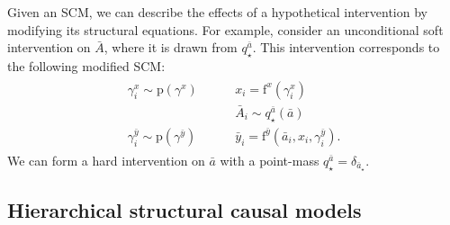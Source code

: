 \documentclass[12pt]{article}
\newcommand{\pr}{\mathrm{p}}
\newcommand{\f}{\mathrm{f}}
\begin{document}
Given an SCM, we can describe the effects of a hypothetical intervention by modifying its structural equations.  For example, consider an unconditional soft intervention on $\bar{A}$, where it is drawn from $q^{\bar{a}}_\star$. This intervention corresponds to the following modified SCM:
\begin{align}
  \label{eqn:ex-scm-intervene}
  \begin{split}
    \gamma_i^{x} \sim \pr(\gamma^{x}) \,\,\,\,\,\,
    &\,\,\,\,\,\,\, x_i = \f^x(\gamma^{x}_i)\\
    &\,\,\,\,\,\,\,\bar{A}_i \sim q_\star^{\bar{a}}(\bar{a})\\
    \gamma_i^{\bar{y}} \sim \pr(\gamma^{\bar{y}}) \,\,\,\,\,\,
    &\,\,\,\,\,\,\, \bar{y}_i = \f^{\bar{y}}(\bar{a}_i, x_i, \gamma_i^{\bar{y}}).
  \end{split}
\end{align}
We can form a hard intervention on $\bar{a}$ with a point-mass
$q_\star^{\bar{a}} = \delta_{\bar{a}_\star}$.

\subsection{Hierarchical structural causal models} \label{sec:hscm-intro}
\end{document}
